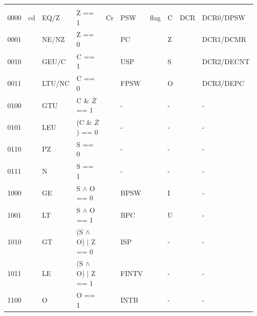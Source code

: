 \begin{table}
\begin{subtable}{\linewidth}
\begin{center}
\begin{tabular}{l|lll|ll|ll|ll}
                &         &           &                                 &                 &               &       &          &       &             \\
0000            & cd      & EQ/Z      & Z == 1                          & Cr              & PSW           & flag  & C        & DCR   & DCR0/DPSW   \\
0001            &         & NE/NZ     & Z == 0                          &                 & PC            &       & Z        &       & DCR1/DCMR   \\
0010            &         & GEU/C     & C == 1                          &                 & USP           &       & S        &       & DCR2/DECNT  \\
0011            &         & LTU/NC    & C == 0                          &                 & FPSW          &       & O        &       & DCR3/DEPC   \\
0100            &         & GTU       & C \& $\overline{Z}$ == 1        &                 & -             &       & -        &       & -           \\
0101            &         & LEU       & (C \& $\overline{Z}$) == 0      &                 & -             &       & -        &       & -           \\
0110            &         & PZ        & S == 0                          &                 & -             &       & -        &       & -           \\
0111            &         & N         & S == 1                          &                 & -             &       & -        &       & -           \\
1000            &         & GE        & S $\wedge$ O == 0               &                 & BPSW          &       & I        &       & -           \\
1001            &         & LT        & S $\wedge$ O == 1               &                 & BPC           &       & U        &       & -           \\
1010            &         & GT        & (S $\wedge$ O) $\mid$ Z == 0    &                 & ISP           &       & -        &       & -           \\
1011            &         & LE        & (S $\wedge$ O) $\mid$ Z == 1    &                 & FINTV         &       & -        &       & -           \\
1100            &         & O         & O == 1                          &                 & INTB          &       & -        &       & -           \\

\end{tabular}
\end{center}
\end{subtable}
\end{table}
